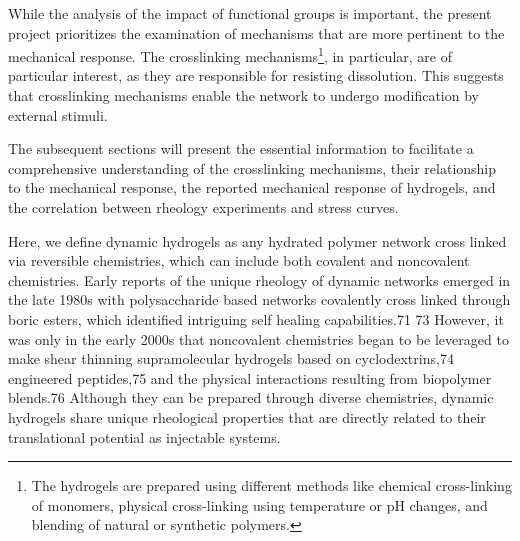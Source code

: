 
While the analysis of the impact of functional groups is important, the present project prioritizes the examination of mechanisms that are more pertinent to the mechanical response. 
The crosslinking mechanisms\footnote{The hydrogels are prepared using different methods like chemical cross-linking of monomers, physical cross-linking using temperature or pH changes, and blending of natural or synthetic polymers.}, in particular, are of particular interest, as they are responsible for resisting dissolution. 
This suggests that crosslinking mechanisms enable the network to undergo modification by external stimuli.

The subsequent sections will present the essential information to facilitate a comprehensive understanding of the crosslinking mechanisms, their relationship to the mechanical response, the reported mechanical response of hydrogels, and the correlation between rheology experiments and stress curves.


Here, we define dynamic hydrogels as any hydrated polymer network cross linked via reversible chemistries, which can include both covalent and noncovalent chemistries. 
Early reports of the unique rheology of dynamic networks emerged in the late 1980s with polysaccharide based networks covalently cross linked through boric esters, which  identified intriguing self healing capabilities.71 73 
However, it was only in the early 2000s that noncovalent chemistries began to be leveraged to make shear thinning supramolecular  hydrogels based on cyclodextrins,74 engineered peptides,75 and the physical interactions resulting from biopolymer  blends.76 
Although they can be prepared through diverse chemistries, dynamic hydrogels share unique rheological properties that are directly related to their translational potential as injectable systems\citep{correaTranslationalApplicationsHydrogels2021}. 

